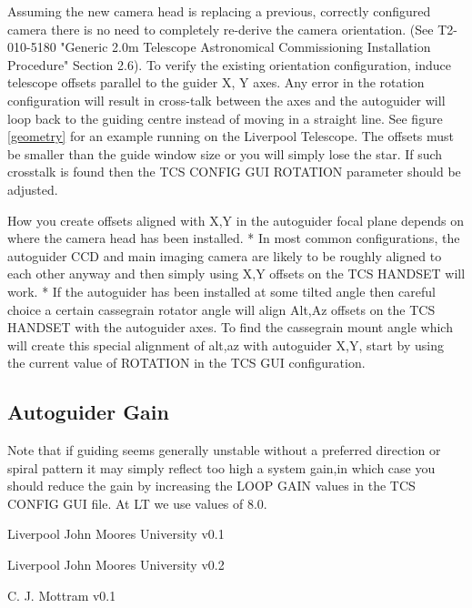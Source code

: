 \documentclass[10pt,a4paper]{article}
\begin{document}
Assuming the new camera head is replacing a previous, correctly configured camera
there is no need to completely re-derive the camera orientation. (See T2-010-5180 
"Generic 2.0m Telescope Astronomical Commissioning Installation Procedure" 
Section 2.6). To verify the existing orientation configuration,
induce telescope offsets parallel to the guider X, Y axes. Any error in the rotation 
configuration will result in cross-talk between the axes and the autoguider 
will loop back to the guiding centre instead of moving in a straight line. 
See figure \ref{geometry} for an example running on the Liverpool Telescope. 
The offsets must be smaller than the guide window size or you will simply 
lose the star. If such crosstalk is found then the TCS CONFIG GUI ROTATION 
parameter should be adjusted.

How you create offsets aligned with X,Y in the autoguider focal plane depends on where the
camera head has been installed. 
* In most common configurations, the autoguider CCD
and main imaging camera are likely to be roughly aligned to each other anyway and then
simply using X,Y offsets on the TCS HANDSET will work. 
* If the autoguider has been installed at some tilted angle then careful choice a certain 
cassegrain rotator angle will align Alt,Az offsets on the TCS HANDSET with the autoguider 
axes. To find the cassegrain mount angle which will create this special alignment of alt,az with
autoguider X,Y, start by using the current value of ROTATION in the TCS GUI configuration.


\subsection{Autoguider Gain}

Note that if guiding seems generally unstable without a preferred
direction or spiral pattern it may simply reflect too high a system
gain,in which case you should reduce the gain by increasing the LOOP GAIN
values in the TCS CONFIG GUI file.  At LT we use values of 8.0.

\begin{thebibliography}{99}

Liverpool John Moores University   v0.1

Liverpool John Moores University   v0.2

C. J. Mottram   v0.1

\end{thebibliography}
\end{document}
